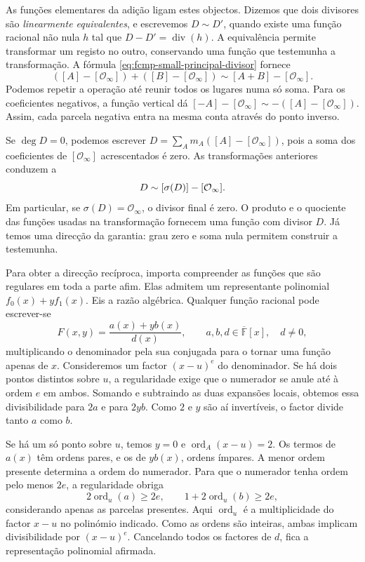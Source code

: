 As funções elementares da adição ligam estes objectos. Dizemos que
dois divisores são \emph{linearmente equivalentes}, e escrevemos
\(D\sim D'\), quando existe uma função racional não nula \(h\)
tal que \(D-D'=\operatorname{div}(h)\). A equivalência permite
transformar um registo no outro, conservando uma função que testemunha
a transformação. A fórmula \eqref{eq:fcmp-small-principal-divisor}
fornece
\[
 ([A]-[\mathcal O_\infty])+([B]-[\mathcal O_\infty])
 \sim[A+B]-[\mathcal O_\infty].
\]
Podemos repetir a operação até reunir todos os lugares numa só soma.
Para os coeficientes negativos, a função vertical dá
\([-A]-[\mathcal O_\infty]\sim-([A]-[\mathcal O_\infty])\).
Assim, cada parcela negativa entra na mesma conta através do ponto
inverso.

Se \(\deg D=0\), podemos escrever
\(D=\sum_A m_A([A]-[\mathcal O_\infty])\), pois a soma dos
coeficientes de \([\mathcal O_\infty]\) acrescentados é zero.
As transformações anteriores conduzem a
\begin{equation}
 D\sim[\sigma(D)]-[\mathcal O_\infty].
 \label{eq:divisors-reduced-class}
\index{sigma d@\(\sigma(D)\), soma de pontos de um divisor}
\end{equation}
Em particular, se \(\sigma(D)=\mathcal O_\infty\), o divisor final
é zero. O produto e o quociente das funções usadas na transformação
fornecem uma função com divisor \(D\). Já temos uma direcção da
garantia: grau zero e soma nula permitem construir a testemunha.

Para obter a direcção recíproca, importa compreender as funções que
são regulares em toda a parte afim. Elas admitem um representante
polinomial \(f_0(x)+yf_1(x)\). Eis a razão algébrica. Qualquer função
racional pode escrever-se
\[
 F(x,y)=\frac{a(x)+yb(x)}{d(x)},
 \qquad a,b,d\in\overline{\mathbb F}[x],\quad d\ne0,
\]
multiplicando o denominador pela sua conjugada para o tornar uma
função apenas de \(x\). Consideremos um factor \((x-u)^e\)
do denominador. Se há dois pontos distintos sobre \(u\), a
regularidade exige que o numerador se anule até à ordem \(e\)
em ambos. Somando e subtraindo as duas expansões locais, obtemos
essa divisibilidade para \(2a\) e para \(2yb\). Como \(2\) e
\(y\) são aí invertíveis, o factor divide tanto \(a\) como \(b\).

Se há um só ponto sobre \(u\), temos \(y=0\) e
\(\operatorname{ord}_A(x-u)=2\). Os termos de \(a(x)\) têm
ordens pares, e os de \(yb(x)\), ordens ímpares. A menor ordem
presente determina a ordem do numerador. Para que o
numerador tenha ordem pelo menos \(2e\), a regularidade obriga
\[
 2\operatorname{ord}_u(a)\geq2e,
 \qquad 1+2\operatorname{ord}_u(b)\geq2e,
\]
considerando apenas as parcelas presentes. Aqui \(\operatorname{ord}_u\)
é a multiplicidade do factor \(x-u\) no polinómio indicado.
Como as ordens são inteiras, ambas implicam divisibilidade por \((x-u)^e\).
Cancelando todos os factores de \(d\), fica a representação
polinomial afirmada.

